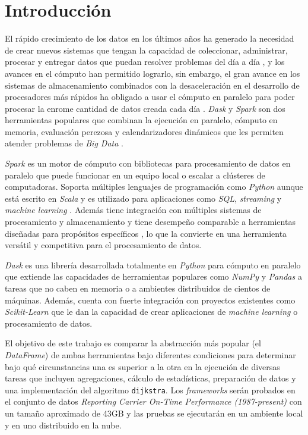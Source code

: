 \chapter*{Introducción}


\noindent El rápido crecimiento de los datos en los últimos años ha generado la necesidad de crear nuevos sistemas que tengan la capacidad de coleccionar, administrar, procesar y entregar datos que puedan resolver problemas del día a día \cite{seagate}, y los avances en el cómputo han permitido lograrlo, sin embargo, el gran avance en los sistemas de almacenamiento combinados con la desaceleración en el desarrollo de procesadores más rápidos ha obligado a usar el cómputo en paralelo para poder procesar la enrome cantidad de datos creada cada día \cite{sparkguide}. \textit{Dask} y \textit{Spark} son dos herramientas populares que combinan la ejecución en paralelo, cómputo en memoria, evaluación perezosa y calendarizadores dinámicos que les permiten atender problemas de \textit{Big Data} \cite{dask-spark-neuroimaging}.

\textit{Spark} es un motor de cómputo con bibliotecas para procesamiento de datos en paralelo que puede funcionar en un equipo local o escalar a clústeres de computadoras. Soporta múltiples lenguajes de programación como \textit{Python} aunque está escrito en \textit{Scala} y es utilizado para aplicaciones como \textit{SQL}, \textit{streaming} y \textit{machine learning} \cite{sparkguide}. Además tiene integración con múltiples sistemas de procesamiento y almacenamiento y tiene desempeño comparable a herramientas diseñadas para propósitos específicos \cite{sparkberkeley}, lo que la convierte en una herramienta versátil y competitiva para el procesamiento de datos. 

\textit{Dask} es una librería desarrollada totalmente en \textit{Python} para cómputo en paralelo que extiende las capacidades de herramientas populares como \textit{NumPy} y \textit{Pandas} a tareas que no caben en memoria o a ambientes distribuidos de cientos de máquinas. Además, cuenta con fuerte integración con proyectos existentes como \textit{Scikit-Learn} que le dan la capacidad de crear aplicaciones de \textit{machine learning} o procesamiento de datos.


El objetivo de este trabajo es comparar la abstracción más popular (el \textit{DataFrame}) de ambas herramientas bajo diferentes condiciones para determinar bajo qué circunstancias una es superior a la otra en la ejecución de diversas tareas que incluyen agregaciones, cálculo de estadísticas, preparación de datos y una implementación del algoritmo \texttt{dijkstra}. Los \textit{frameworks} serán probados en el conjunto de datos \textit{Reporting Carrier On-Time Performance (1987-present)} con un tamaño aproximado de 43GB y las pruebas se ejecutarán en un ambiente local y en uno distribuido en la nube.

